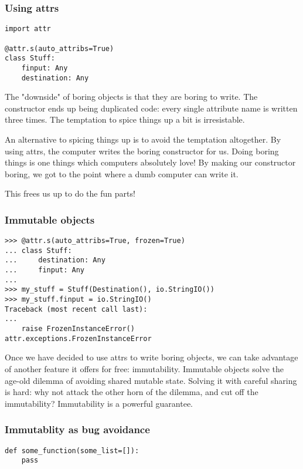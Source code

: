 \begin{frame}[fragile]
\frametitle{Using attrs}

\begin{lstlisting}
import attr

@attr.s(auto_attribs=True)
class Stuff:
    finput: Any
    destination: Any
\end{lstlisting}

\end{frame}

The "downside" of boring objects is that they
are boring to write.
The constructor ends up being duplicated code:
every single attribute name is written three times.
The temptation to spice things up a bit is irresistable.

An alternative to spicing things up
is to avoid the temptation altogether.
By using attrs,
the computer writes the boring constructor for us.
Doing boring things is one things which computers absolutely love!
By making our constructor boring,
we got to the point where a dumb computer can write it.

This frees us up to do the fun parts!

\begin{frame}[fragile]
\frametitle{Immutable objects}

\begin{lstlisting}
>>> @attr.s(auto_attribs=True, frozen=True)
... class Stuff:
...     destination: Any
...     finput: Any
... 
>>> my_stuff = Stuff(Destination(), io.StringIO())
>>> my_stuff.finput = io.StringIO()
Traceback (most recent call last):
...
    raise FrozenInstanceError()
attr.exceptions.FrozenInstanceError
\end{lstlisting}

\end{frame}

Once we have decided to use attrs to write boring objects,
we can take advantage of another feature it offers
for free:
immutability.
Immutable objects solve the age-old dilemma of avoiding shared mutable state.
Solving it with careful sharing is hard:
why not attack the other horn of the dilemma,
and cut off the immutability?
Immutability is a powerful guarantee.

\begin{frame}[fragile]
\frametitle{Immutablity as bug avoidance}

\begin{lstlisting}
def some_function(some_list=[]):
    pass
\end{lstlisting}

\end{frame}

